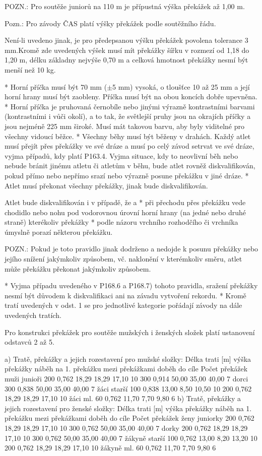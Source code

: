 POZN.: Pro soutěže juniorů na 110 m je přípustná výška překážek až 1,00 m.

Pozn.: Pro závody ČAS platí výšky překážek podle soutěžního řádu.

Není-li uvedeno jinak, je pro předepsanou výšku překážek povolena tolerance 3 mm.Kromě zde uvedených výšek musí mít překážky šířku v rozmezí od 1,18 do 1,20 m, délku základny nejvýše 0,70 m a celková hmotnost překážky nesmí být menší než 10 kg.

* Horní příčka musí být 70 mm ($\pm$5 mm) vysoká, o tloušťce 10 až 25 mm a její horní hrany musí být zaobleny. Příčka musí být na obou koncích dobře upevněna.
* Horní příčka je pruhovaná černobíle nebo jinými výrazně kontrastními barvami (kontrastními i vůči okolí), a to tak, že světlejší pruhy jsou na okrajích příčky a jsou nejméně 225 mm široké. Musí mát takovou barvu, aby byly viditelné pro všechny vidoucí běžce.
* Všechny běhy musí být běženy v drahách. Každý atlet musí přejít přes překážky ve své dráze a musí po celý závod setrvat ve své dráze, vyjma případů, kdy platí P163.4. Vyjma situace, kdy to neovlivní běh nebo nebude bránit jinému atletu či atletům v běhu, bude atlet rovněž diskvalifikován, pokud přímo nebo nepřímo srazí nebo výrazně posune překážku v jiné dráze.
* Atlet musí překonat všechny překážky, jinak bude diskvalifikován.

Atlet bude diskvalifikován i v případě, že
  \begitems \style a
  * při přechodu přes překážku vede chodidlo nebo nohu pod vodorovnou úrovní horní hrany (na jedné nebo druhé straně) kterékoliv překážky
  * podle názoru vrchního rozhodčího či vrchníka úmyslně porazí některou překážku.
  \enditems

POZN.: Pokud je toto pravidlo jinak dodrženo a nedojde k posunu překážky nebo jejího snížení jakýmkoliv způsobem, vč. naklonění v kterémkoliv směru, atlet může překážku překonat jakýmkoliv způsobem.

* Vyjma případu uvedeného v P168.6 a  P168.7) tohoto pravidla, sražení překážky nesmí být důvodem k diskvalifikaci ani na závadu vytvoření rekordu.
* Kromě tratí uvedených v odst. 1 se pro jednotlivé kategorie pořádají závody na dále uvedených tratích.

Pro konstrukci překážek pro soutěže mužských i ženských složek platí ustanovení odstavců 2 až 5.
\enditems

a)	Tratě, překážky a jejich rozestavení pro mužské složky:
	Délka trati [m]
		výška překážky	náběh na
1. překážku	mezi překážkami	doběh do cíle	Počet překážek
muži
junioři	200	0,762	18,29	18,29	17,10	10
	300	0,914	50,00	35,00	40,00	7
dorci	300	0,838	50,00	35,00	40,00	7
žáci
starší	100	0,838	13,00	     8,50	10,50	10
	200	0,762	18,29	18,29	17,10	10
žáci ml.	60	0,762	11,70	  7,70	9,80	6
b)	Tratě, překážky a jejich rozestavení pro ženské složky:
	Délka trati [m]
		výška překážky	náběh na
1. překážku	mezi překážkami	doběh do cíle	Počet překážek
ženy
juniorky	200	0,762	18,29	18,29	17,10	10
	300	0,762	50,00	35,00	40,00	7
dorky	200	0,762	18,29	18,29	17,10	10
	300	0,762	50,00	35,00	40,00	7
žákyně
starší	100	0,762	13,00	    8,20	13,20	10
	200	0,762	18,29	18,29	17,10	10
žákyně ml.	60	0,762	11,70	  7,70	9,80	6


